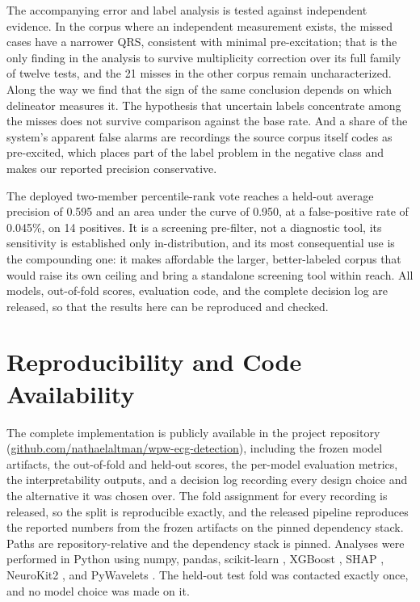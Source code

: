 \documentclass[11pt]{article}
\begin{document}
The accompanying error and label analysis is tested against independent evidence. In the corpus where an independent measurement exists, the missed cases have a narrower QRS, consistent with minimal pre-excitation; that is the only finding in the analysis to survive multiplicity correction over its full family of twelve tests, and the 21 misses in the other corpus remain uncharacterized. Along the way we find that the sign of the same conclusion depends on which delineator measures it. The hypothesis that uncertain labels concentrate among the misses does not survive comparison against the base rate. And a share of the system's apparent false alarms are recordings the source corpus itself codes as pre-excited, which places part of the label problem in the negative class and makes our reported precision conservative.

The deployed two-member percentile-rank vote reaches a held-out average precision of 0.595 and an area under the curve of 0.950, at a false-positive rate of 0.045\%, on 14 positives. It is a screening pre-filter, not a diagnostic tool, its sensitivity is established only in-distribution, and its most consequential use is the compounding one: it makes affordable the larger, better-labeled corpus that would raise its own ceiling and bring a standalone screening tool within reach. All models, out-of-fold scores, evaluation code, and the complete decision log are released, so that the results here can be reproduced and checked.

\FloatBarrier
\section*{Reproducibility and Code Availability}

The complete implementation is publicly available in the project repository (\href{https://github.com/nathaelaltman/wpw-ecg-detection}{github.com/nathaelaltman/wpw-ecg-detection}), including the frozen model artifacts, the out-of-fold and held-out scores, the per-model evaluation metrics, the interpretability outputs, and a decision log recording every design choice and the alternative it was chosen over. The fold assignment for every recording is released, so the split is reproducible exactly, and the released pipeline reproduces the reported numbers from the frozen artifacts on the pinned dependency stack. Paths are repository-relative and the dependency stack is pinned. Analyses were performed in Python using numpy, pandas, scikit-learn \cite{sklearn}, XGBoost \cite{xgboost}, SHAP \cite{shap}, NeuroKit2 \cite{neurokit}, and PyWavelets \cite{pywavelets}. The held-out test fold was contacted exactly once, and no model choice was made on it.
\end{document}
